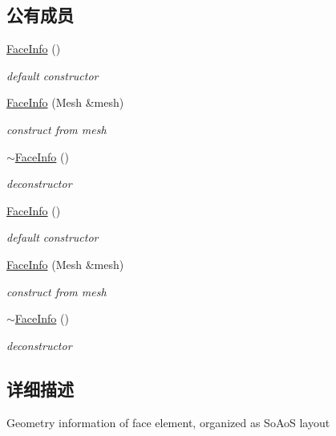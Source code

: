 \subsection*{公有成员}
\begin{DoxyCompactItemize}
\item 
\hyperlink{classFaceInfo_aaffd1ea3649f3615951ba1afed75c78e}{FaceInfo} ()
\begin{DoxyCompactList}\small\item\em default constructor \item\end{DoxyCompactList}\item 
\hyperlink{classFaceInfo_a16c57584efc83ad350316d63a4bec29d}{FaceInfo} (Mesh \&mesh)
\begin{DoxyCompactList}\small\item\em construct from mesh \item\end{DoxyCompactList}\item 
\hyperlink{classFaceInfo_adc5fc3ff520ec912c4edc313015e22ca}{$\sim$FaceInfo} ()
\begin{DoxyCompactList}\small\item\em deconstructor \item\end{DoxyCompactList}\item 
\hyperlink{classFaceInfo_aaffd1ea3649f3615951ba1afed75c78e}{FaceInfo} ()
\begin{DoxyCompactList}\small\item\em default constructor \item\end{DoxyCompactList}\item 
\hyperlink{classFaceInfo_a16c57584efc83ad350316d63a4bec29d}{FaceInfo} (Mesh \&mesh)
\begin{DoxyCompactList}\small\item\em construct from mesh \item\end{DoxyCompactList}\item 
\hyperlink{classFaceInfo_adc5fc3ff520ec912c4edc313015e22ca}{$\sim$FaceInfo} ()
\begin{DoxyCompactList}\small\item\em deconstructor \item\end{DoxyCompactList}\end{DoxyCompactItemize}


\subsection{详细描述}
Geometry information of face element, organized as SoAoS layout 

